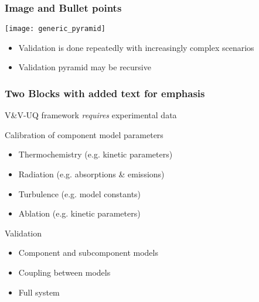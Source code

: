 \documentclass[mathserif]{beamer}
\begin{document}
\begin{frame}                                                                                                                                                                          
\frametitle{Image and Bullet points}
\begin{center}
\texttt{[image: generic\_pyramid]}\\
\begin{itemize}
\item Validation is done repeatedly with increasingly complex scenarios
\item Validation pyramid may be recursive
\end{itemize}
\end{center}
\end{frame}              
\begin{frame}
\frametitle{Two Blocks with added text for emphasis}

{\color{pecos2}V\&V-UQ framework \emph{requires} experimental data}
\begin{block}{Calibration of component model parameters}
\begin{itemize}
\item Thermochemistry (e.g. kinetic parameters)
\item Radiation (e.g. absorptions \& emissions)
\item Turbulence (e.g. model constants)
\item Ablation (e.g. kinetic parameters)
\end{itemize}
\end{block}
\begin{block}{Validation}
\begin{itemize}
\item Component and subcomponent models
\item Coupling between models
\item Full system
\end{itemize}
\end{block}
\end{frame}
\end{document}

